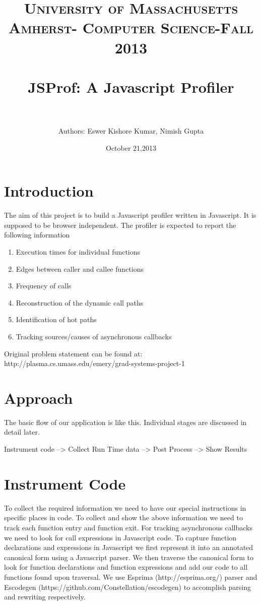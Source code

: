 \documentclass[paper=a4, fontsize=11pt]{scrartcl} %
\title{	
\normalfont \normalsize 
\textsc{University of Massachusetts Amherst- Computer Science-Fall 2013} \\ [25pt] %
\horrule{0.5pt} \\[0.4cm] %
\huge JSProf: A Javascript Profiler \\ %
\horrule{2pt} \\[0.5cm] %
}
\author{Authors: Eswer Kishore Kumar, Nimish Gupta} %
\date{October 21,2013} %
\numberwithin{equation}{section} %
\numberwithin{figure}{section} %
\numberwithin{table}{section} %
\begin{document}
\maketitle %


\section{Introduction}

The aim of this project is to build a Javascript profiler written in Javascript. It is supposed to be browser independent. The profiler is expected to report the following information


\begin{enumerate}
\item Execution times for individual functions
\item Edges between caller and callee functions 
\item Frequency of calls
\item Reconstruction of the dynamic call paths
\item Identification of hot paths 
\item Tracking sources/causes of asynchronous callbacks
\end{enumerate}

Original problem statement can be found at: http://plasma.cs.umass.edu/emery/grad-systems-project-1 


\section{Approach}
The basic flow of our application is like this. Individual stages are discussed in detail later.

Instrument code --> Collect Run Time data --> Post Process --> Show Results

\section{Instrument Code}
To collect the required information we need to have our special instructions in specific places in code. To collect and show the above information we need to track each function entry and function exit. For tracking asynchronous callbacks we need to look for call expressions in Javascript code. To capture function declarations and expressions in Javascript we first represent it into an annotated canonical form using a Javascript parser. We then traverse the canonical form to look for function declarations and function expressions and add our code to all functions found upon traversal. We use Esprima (http://esprima.org/) parser and Escodegen (https://github.com/Constellation/escodegen) to accomplish parsing and rewriting respectively.
\end{document}
